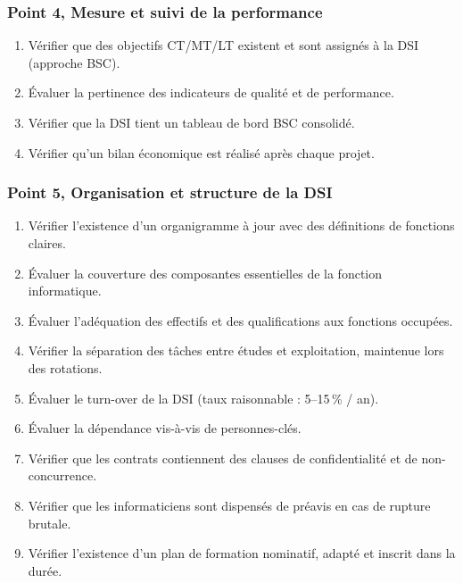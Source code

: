 \subsubsection{Point 4, Mesure et suivi de la performance}
\begin{enumerate}[label=4.\arabic*.]
    \item Vérifier que des objectifs CT/MT/LT existent et sont assignés à la DSI (approche BSC).
    \item Évaluer la pertinence des indicateurs de qualité et de performance.
    \item Vérifier que la DSI tient un tableau de bord BSC consolidé.
    \item Vérifier qu'un bilan économique est réalisé après chaque projet.
\end{enumerate}

\subsubsection{Point 5, Organisation et structure de la DSI}
\begin{enumerate}[label=5.\arabic*.]
    \item Vérifier l'existence d'un organigramme à jour avec des définitions de fonctions claires.
    \item Évaluer la couverture des composantes essentielles de la fonction informatique.
    \item Évaluer l'adéquation des effectifs et des qualifications aux fonctions occupées.
    \item Vérifier la séparation des tâches entre études et exploitation, maintenue lors des rotations.
    \item Évaluer le turn-over de la DSI (taux raisonnable : 5--15\,\% / an).
    \item Évaluer la dépendance vis-à-vis de personnes-clés.
    \item Vérifier que les contrats contiennent des clauses de confidentialité et de non-concurrence.
    \item Vérifier que les informaticiens sont dispensés de préavis en cas de rupture brutale.
    \item Vérifier l'existence d'un plan de formation nominatif, adapté et inscrit dans la durée.
\end{enumerate}

